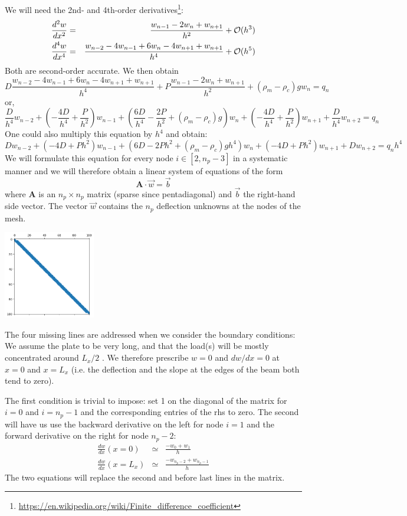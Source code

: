 We will need the 2nd- and 4th-order 
derivatives\footnote{\url{https://en.wikipedia.org/wiki/Finite_difference_coefficient}}:
\begin{eqnarray}
\frac{d^2w}{dx^2} &=& \frac{w_{n-1}-2w_n+w_{n+1}}{h^2} 
+{\cal O}(h^3) \\
\frac{d^4w}{dx^4} &=& \frac{w_{n-2}-4w_{n-1}+6w_n-4w_{n+1}+w_{n+1}}{h^4}
+{\cal O}(h^5)
\end{eqnarray}
Both are second-order accurate. We then obtain 
\[
D\frac{w_{n-2}-4w_{n-1}+6w_n-4w_{n+1}+w_{n+1}}{h^4}
+P\frac{w_{n-1}-2w_n+w_{n+1}}{h^2} 
+(\rho_m-\rho_c)g w_n = q_n
\]
or, 
\[
\boxed{
\frac{D}{h^4} w_{n-2}
+\left(-\frac{4D}{h^4}+\frac{P}{h^2}\right)w_{n-1}
+\left(\frac{6D}{h^4}-\frac{2P}{h^2} +(\rho_m-\rho_c)g \right)w_n
+\left(-\frac{4D}{h^4}+\frac{P}{h^2}\right)w_{n+1}
+\frac{D}{h^4} w_{n+2} = q_n
}
\]
One could also multiply this equation by $h^4$ and obtain:
\[
D w_{n-2}
+\left(-4D+Ph^2\right)w_{n-1}
+\left(6D-2Ph^2 +(\rho_m-\rho_c)g h^4 \right)w_n
+\left(-4D+Ph^2\right)w_{n+1}
+D w_{n+2} = q_n h^4
\]
We will formulate this equation for every node $i\in[2,n_p-3]$
in a systematic manner and we will therefore obtain a linear system of equations of the form 
\[
{\bm A} \cdot \vec{w} = \vec{b}
\]
where ${\bm A}$ is an $n_p\times n_p$ matrix (sparse since pentadiagonal) 
and $\vec{b}$ the right-hand side vector. 
The vector $\vec{w}$ contains the $n_p$ deflection unknowns at the nodes of the mesh.

\begin{center}
\includegraphics[width=4cm]{python_codes/fieldstone_105/images/matrix}
\end{center}

The four missing lines are addressed when we consider the boundary conditions:
We assume the plate to be very long, and that the load(s) will be 
mostly concentrated around $L_x/2$ . We therefore 
prescribe $w=0$ and $dw/dx=0$ at $x=0$ and $x=L_x$ (i.e. the deflection and 
the slope at the edges of the beam both tend to zero).

The first condition is trivial to impose: set 1 on the diagonal of the 
matrix for $i=0$ and $i=n_p-1$ and the corresponding entries of the rhs to zero. 
The second will have us use the backward derivative on the left for node $i=1$ and 
the forward derivative on the right for node $n_p-2$:
\begin{eqnarray}
\frac{dw}{dx} (x=0)   &\simeq& \frac{-w_0+w_1}{h} \nonumber\\
\frac{dw}{dx} (x=L_x) &\simeq& \frac{-w_{n_p-2}+w_{n_p-1}}{h}
\end{eqnarray}
The two equations will replace the second and before last 
lines in the matrix.

